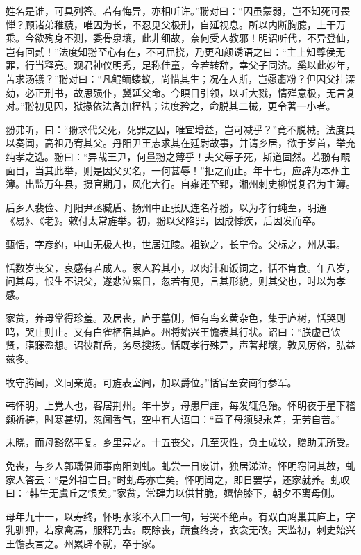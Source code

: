 \documentclass[12pt,UTF8]{ctexbook}
\begin{document}
姓名是谁，可具列答。若有悔异，亦相听许。”翂对曰：“囚虽蒙弱，岂不知死可畏惮？顾诸弟稚藐，唯囚为长，不忍见父极刑，自延视息。所以内断胸臆，上干万乘。今欲殉身不测，委骨泉壤，此非细故，奈何受人教邪！明诏听代，不异登仙，岂有回贰！”法度知翂至心有在，不可屈挠，乃更和颜诱语之曰：“主上知尊侯无罪，行当释亮。观君神仪明秀，足称佳童，今若转辞，幸父子同济。奚以此妙年，苦求汤镬？”翂对曰：“凡鲲鲕蝼蚁，尚惜其生；况在人斯，岂愿齑粉？但囚父挂深劾，必正刑书，故思殒仆，冀延父命。今瞑目引领，以听大戮，情殚意极，无言复对。”翂初见囚，狱掾依法备加桎梏；法度矜之，命脱其二械，更令著一小者。

翂弗听，曰：“翂求代父死，死罪之囚，唯宜增益，岂可减乎？”竟不脱械。法度具以奏闻，高祖乃宥其父。丹阳尹王志求其在廷尉故事，并请乡居，欲于岁首，举充纯孝之选。翂曰：“异哉王尹，何量翂之薄乎！夫父辱子死，斯道固然。若翂有靦面目，当其此举，则是因父买名，一何甚辱！”拒之而止。年十七，应辟为本州主簿。出监万年县，摄官期月，风化大行。自雍还至郢，湘州刺史柳悦复召为主簿。

后乡人裴俭、丹阳尹丞臧盾、扬州中正张仄连名荐翂，以为孝行纯至，明通《易》、《老》。敕付太常旌举。初，翂以父陷罪，因成悸疾，后因发而卒。

甄恬，字彦约，中山无极人也，世居江陵。祖钦之，长宁令。父标之，州从事。

恬数岁丧父，哀感有若成人。家人矜其小，以肉汁和饭饲之，恬不肯食。年八岁，问其母，恨生不识父，遂悲泣累日，忽若有见，言其形貌，则其父也，时以为孝感。

家贫，养母常得珍羞。及居丧，庐于墓侧，恒有鸟玄黄杂色，集于庐树，恬哭则鸣，哭止则止。又有白雀栖宿其庐。州将始兴王憺表其行状。诏曰：“朕虚己钦贤，寤寐盈想。诏彼群岳，务尽搜扬。恬既孝行殊异，声著邦壤，敦风厉俗，弘益兹多。

牧守腾闻，义同亲览。可旌表室闾，加以爵位。”恬官至安南行参军。

韩怀明，上党人也，客居荆州。年十岁，母患尸疰，每发辄危殆。怀明夜于星下稽颡祈祷，时寒甚切，忽闻香气，空中有人语曰：“童子母须臾永差，无劳自苦。”

未晓，而母豁然平复。乡里异之。十五丧父，几至灭性，负土成坟，赠助无所受。

免丧，与乡人郭瑀俱师事南阳刘虬。虬尝一日废讲，独居涕泣。怀明窃问其故，虬家人答云：“是外祖亡日。”时虬母亦亡矣。怀明闻之，即日罢学，还家就养。虬叹曰：“韩生无虞丘之恨矣。”家贫，常肆力以供甘脆，嬉怡膝下，朝夕不离母侧。

母年九十一，以寿终，怀明水浆不入口一旬，号哭不绝声。有双白鸠巢其庐上，字乳驯狎，若家禽焉，服释乃去。既除丧，蔬食终身，衣衾无改。天监初，刺史始兴王憺表言之。州累辟不就，卒于家。
\end{document}
